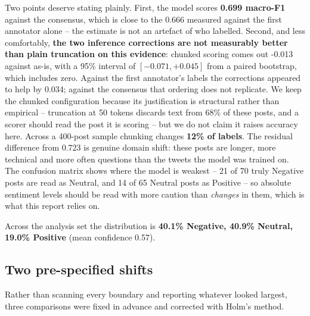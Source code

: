 \documentclass[11pt,a4paper]{article}
\begin{document}
Two points deserve stating plainly. First, the model scores \textbf{0.699 macro-F1} against the consensus, which is close to the 0.666 measured against the first annotator alone -- the estimate is not an artefact of who labelled. Second, and less comfortably, \textbf{the two inference corrections are not measurably better than plain truncation on this evidence}: chunked scoring comes out -0.013 against as-is, with a 95\% interval of $[-0.071, +0.045]$ from a paired bootstrap, which includes zero. Against the first annotator's labels the corrections appeared to help by 0.034; against the consensus that ordering does not replicate. We keep the chunked configuration because its justification is structural rather than empirical -- truncation at 50 tokens discards text from 68\% of these posts, and a scorer should read the post it is scoring -- but we do not claim it raises accuracy here. Across a 400-post sample chunking changes \textbf{12\% of labels}. The residual difference from 0.723 is genuine domain shift: these posts are longer, more technical and more often questions than the tweets the model was trained on. The confusion matrix shows where the model is weakest -- 21 of 70 truly Negative posts are read as Neutral, and 14 of 65 Neutral posts as Positive -- so absolute sentiment levels should be read with more caution than \emph{changes} in them, which is what this report relies on.

Across the analysis set the distribution is \textbf{40.1\% Negative, 40.9\% Neutral, 19.0\% Positive} (mean confidence 0.57).

\subsection{Two pre-specified shifts}

Rather than scanning every boundary and reporting whatever looked largest, three comparisons were fixed in advance and corrected with Holm's method.
\end{document}
